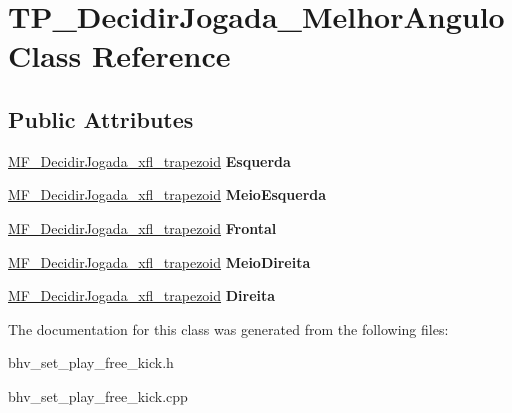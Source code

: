 \hypertarget{classTP__DecidirJogada__MelhorAngulo}{
\section{TP\_\-DecidirJogada\_\-MelhorAngulo Class Reference}
\label{classTP__DecidirJogada__MelhorAngulo}
}
\subsection*{Public Attributes}
\begin{DoxyCompactItemize}
\item 
\hypertarget{classTP__DecidirJogada__MelhorAngulo_a306f449140bddd6f1468717249fa767f}{
\hyperlink{classMF__DecidirJogada__xfl__trapezoid}{MF\_\-DecidirJogada\_\-xfl\_\-trapezoid} {\bfseries Esquerda}}
\label{classTP__DecidirJogada__MelhorAngulo_a306f449140bddd6f1468717249fa767f}

\item 
\hypertarget{classTP__DecidirJogada__MelhorAngulo_a38ff55160649a0358f404266e649097f}{
\hyperlink{classMF__DecidirJogada__xfl__trapezoid}{MF\_\-DecidirJogada\_\-xfl\_\-trapezoid} {\bfseries MeioEsquerda}}
\label{classTP__DecidirJogada__MelhorAngulo_a38ff55160649a0358f404266e649097f}

\item 
\hypertarget{classTP__DecidirJogada__MelhorAngulo_a16dd03c015ecf41e90c837800e86ed31}{
\hyperlink{classMF__DecidirJogada__xfl__trapezoid}{MF\_\-DecidirJogada\_\-xfl\_\-trapezoid} {\bfseries Frontal}}
\label{classTP__DecidirJogada__MelhorAngulo_a16dd03c015ecf41e90c837800e86ed31}

\item 
\hypertarget{classTP__DecidirJogada__MelhorAngulo_aed34f5c45fae1d2f0d9f0df15aa96c55}{
\hyperlink{classMF__DecidirJogada__xfl__trapezoid}{MF\_\-DecidirJogada\_\-xfl\_\-trapezoid} {\bfseries MeioDireita}}
\label{classTP__DecidirJogada__MelhorAngulo_aed34f5c45fae1d2f0d9f0df15aa96c55}

\item 
\hypertarget{classTP__DecidirJogada__MelhorAngulo_af65c6e5224ed0778c3e5eef484657170}{
\hyperlink{classMF__DecidirJogada__xfl__trapezoid}{MF\_\-DecidirJogada\_\-xfl\_\-trapezoid} {\bfseries Direita}}
\label{classTP__DecidirJogada__MelhorAngulo_af65c6e5224ed0778c3e5eef484657170}

\end{DoxyCompactItemize}


The documentation for this class was generated from the following files:\begin{DoxyCompactItemize}
\item 
bhv\_\-set\_\-play\_\-free\_\-kick.h\item 
bhv\_\-set\_\-play\_\-free\_\-kick.cpp\end{DoxyCompactItemize}
